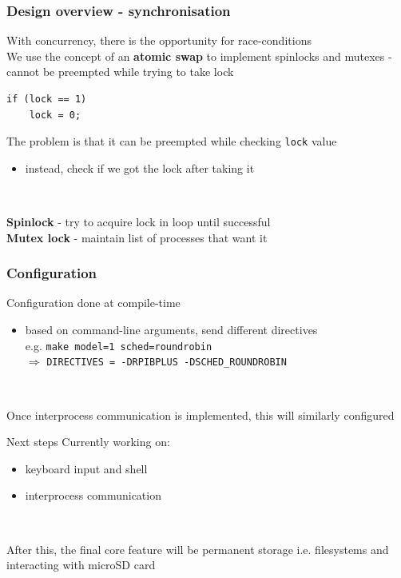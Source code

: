\documentclass[10pt]{beamer}
\newcommand{\code}[1]{\texttt{#1}}
\begin{document}
\begin{frame}[fragile]
    \frametitle{Design overview - synchronisation}
    With concurrency, there is the opportunity for race-conditions \\

    We use the concept of an \textbf{atomic swap} to implement spinlocks and mutexes - cannot be preempted while trying to take lock

    \lstset{language=C,basicstyle=\ttfamily}
    \begin{lstlisting}
if (lock == 1)
    lock = 0;
    \end{lstlisting}

    The problem is that it can be preempted while checking \code{lock} value
    \begin{itemize}
        \item instead, check if we got the lock after taking it
    \end{itemize} ~

    \textbf{Spinlock} - try to acquire lock in loop until successful \\
    \textbf{Mutex lock} - maintain list of processes that want it
\end{frame}

\begin{frame}[fragile]
    \frametitle{Configuration}
    Configuration done at compile-time
    \begin{itemize}
        \item based on command-line arguments, send different directives \\
        e.g. \code{make model=1 sched=roundrobin} \\
        $\Rightarrow$ \code{DIRECTIVES = -DRPIBPLUS -DSCHED\_ROUNDROBIN}
    \end{itemize} ~

    Once interprocess communication is implemented, this will similarly configured
\end{frame}

\begin{frame}{Next steps}
    Currently working on:
    \begin{itemize}
        \item keyboard input and shell
        \item interprocess communication
    \end{itemize} ~

    After this, the final core feature will be permanent storage i.e. filesystems and interacting with microSD card
\end{frame}
\end{document}

